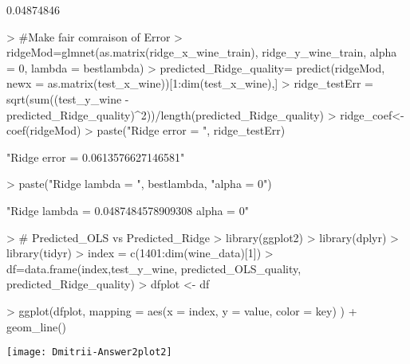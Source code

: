 \documentclass{article}
\begin{document}
\begin{Schunk}
\begin{Soutput}
[1] 0.04874846
\end{Soutput}
\begin{Sinput}
> #Make fair comraison of Error
> ridgeMod=glmnet(as.matrix(ridge_x_wine_train), ridge_y_wine_train, alpha = 0, lambda = bestlambda)
> predicted_Ridge_quality= predict(ridgeMod, newx = as.matrix(test_x_wine))[1:dim(test_x_wine),]
> ridge_testErr = sqrt(sum((test_y_wine - predicted_Ridge_quality)^2))/length(predicted_Ridge_quality)
> ridge_coef<-coef(ridgeMod)
> paste("Ridge error = ", ridge_testErr)
\end{Sinput}
\begin{Soutput}
[1] "Ridge error =  0.0613576627146581"
\end{Soutput}
\begin{Sinput}
> paste("Ridge lambda = ", bestlambda, "alpha = 0")
\end{Sinput}
\begin{Soutput}
[1] "Ridge lambda =  0.0487484578909308 alpha = 0"
\end{Soutput}
\begin{Sinput}
> # Predicted_OLS vs Predicted_Ridge
> library(ggplot2)
> library(dplyr)
> library(tidyr)
> index = c(1401:dim(wine_data)[1])
> df=data.frame(index,test_y_wine, predicted_OLS_quality, predicted_Ridge_quality)
> dfplot <- df %>% gather(key, value, -index)
\end{Sinput}
\end{Schunk}
\begin{Schunk}
\begin{Sinput}
> ggplot(dfplot, mapping = aes(x = index, y = value, color = key) ) + geom_line()
\end{Sinput}
\end{Schunk}
\texttt{[image: Dmitrii-Answer2plot2]}
\end{document}
